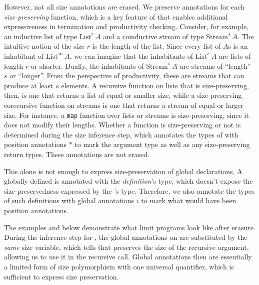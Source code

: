 However, not all size annotations are erased.
We preserve annotations for each \emph{size-preserving} \corecursive function, which is a key feature of \lang that enables additional expressiveness in termination and productivity checking.
Consider, for example, an inductive list of type $\text{List}^r ~ A$ and a coinductive stream of type $\text{Stream}^s ~ A$.
The intuitive notion of the size $r$ is the length of the list.
Since every list of $A$s is an inhabitant of $\text{List}^\infty ~ A$, we can imagine that the inhabitants of $\text{List}^r ~ A$ are lists of length $r$ or shorter.
Dually, the inhabitants of $\text{Stream}^s ~ A$ are streams of ``length'' $s$ or ``longer''.
From the perspective of productivity, these are streams that can produce at least $s$ elements.
A recursive function on lists that is size-preserving, then, is one that returns a list of equal or smaller size, while a size-preserving corecursive function on streams is one that returns a stream of equal or larger size.
For instance, a \texttt{map} function over lists or streams is size-preserving, since it does not modify their lengths.
Whether a \corecursive function is size-preserving or not is determined during the size inference step, which annotates the types of \cofixpoints with position annotations $*$ to mark the \corecursive argument type as well as any size-preserving return types.
These annotations are not erased.

This alone is not enough to express size-preservation of global declarations.
A globally-defined \cofixpoint is annotated with the \emph{definition}'s type, which doesn't expose the size-preservedness expressed by the \emph{\cofixpoint}'s type.
Therefore, we also annotate the types of such definitions with global annotations $\iota$ to mark what would have been position annotations.

The examples  and  below demonstrate what limit \lang programs look like after erasure.
During the inference step for , the global annotations on  are substituted by the \textit{same} size variable, which tells  that  preserves the size of the recursive argument, allowing us to use it in the recursive call.
Global annotations then are essentially a limited form of size polymorphism with one universal quantifier, which is sufficient to express size preservation.

